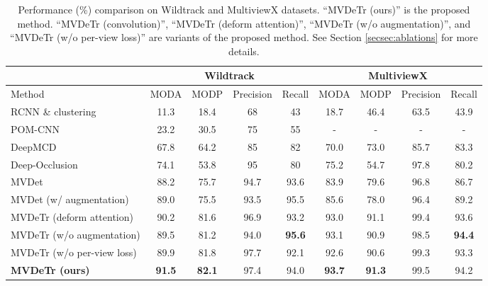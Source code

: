 \documentclass[sigconf,authorversion,nonacm]{acmart}
\begin{document}
\begin{table*}[]
\centering
\begin{tabular}{l|cccc|cccc}
\toprule
                   & \multicolumn{4}{c|}{Wildtrack} & \multicolumn{4}{c}{MultiviewX} \\ \hline
Method             & MODA  & MODP  & Precision & Recall & MODA  & MODP  & Precision  & Recall \\ \hline
RCNN \& clustering \cite{xu2016multi} & 11.3  & 18.4  & 68    & 43     & 18.7  & 46.4  & 63.5   & 43.9   \\ 
POM-CNN \cite{fleuret2007multicamera}           & 23.2  & 30.5  & 75    & 55     & -     & -     & -      & -      \\ 
DeepMCD \cite{chavdarova2017deep}           & 67.8  & 64.2  & 85    & 82     & 70.0  & 73.0  & 85.7   & 83.3   \\ 
Deep-Occlusion \cite{baque2017deep}    & 74.1  & 53.8  & 95    & 80     & 75.2  & 54.7  & 97.8   & 80.2   \\ 
MVDet \cite{hou2020multiview}             & 88.2  & 75.7  & 94.7  & 93.6   & 83.9  & 79.6  & 96.8   & 86.7   \\ \hline
MVDet (w/ augmentation)             & 89.0  & 75.5  & 93.5  & 95.5   & 85.6  & 78.0  & 96.4   & 89.2   \\ 
MVDeTr (deform attention)             & 90.2  & 81.6  & 96.9  & 93.2   & 93.0  & 91.1  & 99.4   & 93.6   \\ 
MVDeTr (w/o augmentation)             & 89.5  & 81.2  & 94.0  & \textbf{95.6}   & 93.1  & 90.9  & 98.5   & \textbf{94.4}   \\ 
MVDeTr (w/o per-view loss)             & 89.9  & 81.8  & 97.7  & 92.1   & 92.6  & 90.6  & 99.3   & 93.3   \\ \hline
\textbf{MVDeTr (ours)}             & \textbf{91.5}  & \textbf{82.1}  & 97.4  & 94.0   & \textbf{93.7}  & \textbf{91.3}  & 99.5   & 94.2   \\ \bottomrule
\end{tabular}
\caption{Performance (\%) comparison on Wildtrack and MultiviewX datasets. ``MVDeTr (ours)'' is the  proposed method. ``MVDeTr (convolution)'', ``MVDeTr (deform attention)'', ``MVDeTr (w/o augmentation)'', and ``MVDeTr (w/o per-view loss)'' are variants of the proposed method. See Section \ref{secsec:ablations} for more details. }
\label{tab:sota}
\end{table*}
\end{document}
